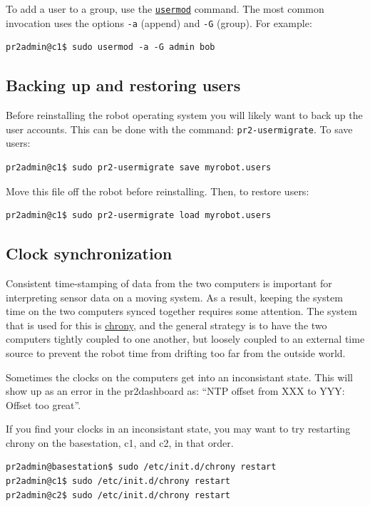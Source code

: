 To add a user to a group, use the
\texttt{\href{http://unixhelp.ed.ac.uk/CGI/man-cgi?usermod}{usermod}}
command.  The most common invocation uses the options \texttt{-a}
(append) and \texttt{-G} (group).  For example:

\begin{verbatim}
pr2admin@c1$ sudo usermod -a -G admin bob
\end{verbatim}

\subsection{Backing up and restoring users}
Before reinstalling the robot operating system you will likely want to
back up the user accounts. This can be done with the command:
\texttt{pr2-usermigrate}. To save users:
\begin{verbatim}
pr2admin@c1$ sudo pr2-usermigrate save myrobot.users
\end{verbatim}

Move this file off the robot before reinstalling.  Then, to restore users:
\begin{verbatim}
pr2admin@c1$ sudo pr2-usermigrate load myrobot.users
\end{verbatim}

\subsection{Clock synchronization}
Consistent time-stamping of data from the two computers is important
for interpreting sensor data on a moving system.  As a result, keeping
the system time on the two computers synced together requires some
attention.  The system that is used for this is
\href{http://chrony.tuxfamily.org/}{chrony}, and the general strategy
is to have the two computers tightly coupled to one another, but
loosely coupled to an external time source to prevent the robot time
from drifting too far from the outside world.

Sometimes the clocks on the computers get into an inconsistant state.
This will show up as an error in the pr2dashboard as: ``NTP offset from XXX to YYY: Offset too great''.

If you find your clocks in an inconsistant state, you may want to try
restarting chrony on the basestation, c1, and c2, in that order.
\begin{verbatim}
pr2admin@basestation$ sudo /etc/init.d/chrony restart
pr2admin@c1$ sudo /etc/init.d/chrony restart
pr2admin@c2$ sudo /etc/init.d/chrony restart
\end{verbatim}

